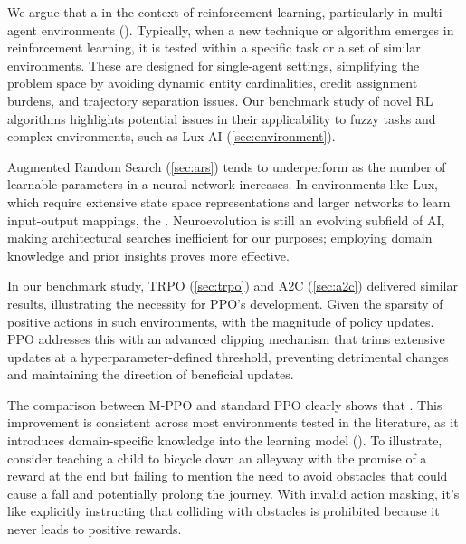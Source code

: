 \noindent We argue that a  in the context of reinforcement learning, particularly in multi-agent environments (\cite{liu2024jointppo}). Typically, when a new technique or algorithm emerges in reinforcement learning, it is tested within a specific task or a set of similar environments. These are designed for single-agent settings, simplifying the problem space by avoiding dynamic entity cardinalities, credit assignment burdens, and trajectory separation issues. Our benchmark study of novel RL algorithms highlights potential issues in their applicability to fuzzy tasks and complex environments, such as Lux AI (\autoref{sec:environment}).

\bigskip

\noindent Augmented Random Search (\autoref{sec:ars}) tends to underperform as the number of learnable parameters in a neural network increases. In environments like Lux, which require extensive state space representations and larger networks to learn input-output mappings, the . Neuroevolution is still an evolving subfield of AI, making architectural searches inefficient for our purposes; employing domain knowledge and prior insights proves more effective.

\bigskip

\noindent In our benchmark study, TRPO (\autoref{sec:trpo}) and A2C (\autoref{sec:a2c}) delivered similar results, illustrating the necessity for PPO’s development. Given the sparsity of positive actions in such environments,  with the magnitude of policy updates. PPO addresses this with an advanced clipping mechanism that trims extensive updates at a hyperparameter-defined threshold, preventing detrimental changes and maintaining the direction of beneficial updates.

\bigskip

\noindent The comparison between M-PPO and standard PPO clearly shows that . This improvement is consistent across most environments tested in the literature, as it introduces domain-specific knowledge into the learning model (\cite{Huang_2022}). To illustrate, consider teaching a child to bicycle down an alleyway with the promise of a reward at the end but failing to mention the need to avoid obstacles that could cause a fall and potentially prolong the journey. With invalid action masking, it's like explicitly instructing that colliding with obstacles is prohibited because it never leads to positive rewards.

